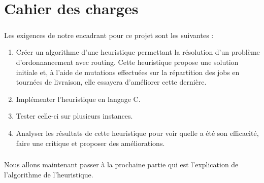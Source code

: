 \chapter{Cahier des charges}

	\paragraph{}
		Les exigences de notre encadrant pour ce projet sont les suivantes :
\begin{enumerate}
\item Créer un algorithme d'une heuristique permettant la résolution d'un problème d'ordonnancement avec routing. Cette heuristique propose une solution initiale et, à l'aide de mutations effectuées sur la répartition des jobs en tournées de livraison, elle essayera d'améliorer cette dernière.
\item Implémenter l'heuristique en langage C.
\item Tester celle-ci sur plusieurs instances.
\item Analyser les résultats de cette heuristique pour voir quelle a été son efficacité, faire une critique et proposer des améliorations.
\end{enumerate} 

	\paragraph{}
	Nous allons maintenant passer à la prochaine partie qui est l'explication de l'algorithme de l'heuristique.